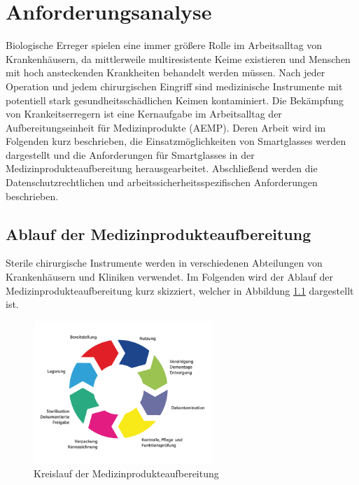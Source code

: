 %
%
%
%
%
%
\chapter{Anforderungsanalyse}
\label{ch:Anforderungsanalyse}
Biologische Erreger spielen eine immer größere Rolle im Arbeitsalltag von Krankenhäusern, da mittlerweile multiresistente Keime existieren \cite{Niknam2017} und Menschen mit hoch ansteckenden Krankheiten behandelt werden müssen. Nach jeder Operation und jedem chirurgischen Eingriff sind medizinische Instrumente mit potentiell stark gesundheitsschädlichen Keimen kontaminiert. Die Bekämpfung von Krankeitserregern ist eine Kernaufgabe im Arbeitsalltag der Aufbereitungseinheit für Medizinprodukte (AEMP). Deren Arbeit wird im Folgenden kurz beschrieben, die Einsatzmöglichkeiten von Smartglasses werden dargestellt und die Anforderungen für Smartglasses in der Medizinprodukteaufbereitung herausgearbeitet. Abschließend werden die Datenschutzrechtlichen und arbeitssicherheitsspezifischen Anforderungen beschrieben.
%
%
%
%
%
%
\section{Ablauf der Medizinprodukteaufbereitung}
\label{sec:Ablauf_der_Medizinprodukteaufbereitung}
Sterile chirurgische Instrumente werden in verschiedenen Abteilungen von Krankenhäusern und Kliniken verwendet. Im Folgenden wird der Ablauf der Medizinprodukteaufbereitung kurz skizziert, welcher in Abbildung \ref{fig:Ablauf_der_Medizinprodukteaufbereitung} dargestellt ist.
%
\begin{figure}[htbp]
    \centering
    \includegraphics[width=0.6\textwidth]{data/bilder/kreislauf-ZSVA.png}
    \caption{Kreislauf der Medizinprodukteaufbereitung \cite{AKI-ArbeitskreisInstrumenten-Aufbereitung2012}}
    \label{fig:Ablauf_der_Medizinprodukteaufbereitung}
\end{figure}

